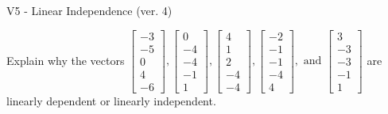 \begin{exercise}
  \begin{exerciseTitle}V5 - Linear Independence (ver. 4)\end{exerciseTitle}
  \begin{exerciseStatement}
    Explain why the vectors \(\left[\begin{array}{r}
-3 \\
-5 \\
0 \\
4 \\
-6
\end{array}\right] , \left[\begin{array}{r}
0 \\
-4 \\
-4 \\
-1 \\
1
\end{array}\right] , \left[\begin{array}{r}
4 \\
1 \\
2 \\
-4 \\
-4
\end{array}\right] , \left[\begin{array}{r}
-2 \\
-1 \\
-1 \\
-4 \\
4
\end{array}\right] , \text{ and } \left[\begin{array}{r}
3 \\
-3 \\
-3 \\
-1 \\
1
\end{array}\right]\) are linearly dependent or linearly independent.	



\end{exerciseStatement}
\end{exercise}
